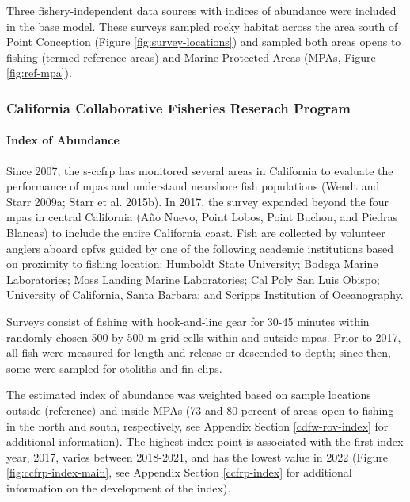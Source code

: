 \documentclass[11pt,
  english,
  letterpaper,
]{article}
\begin{document}
Three fishery-independent data sources with indices of abundance were included in the base model. These surveys sampled rocky habitat across the area south of Point Conception (Figure \ref{fig:survey-locations}) and sampled both areas opens to fishing (termed reference areas) and Marine Protected Areas (MPAs, Figure \ref{fig:ref-mpa}).

\hypertarget{california-collaborative-fisheries-reserach-program}{%
\subsubsection{California Collaborative Fisheries Reserach Program}\label{california-collaborative-fisheries-reserach-program}}

\hypertarget{index-of-abundance}{%
\paragraph{Index of Abundance}\label{index-of-abundance}}

\hfill\break

Since 2007, the \gls{s-ccfrp} has monitored several areas in California to evaluate the performance of \glspl{mpa} and understand nearshore fish populations (Wendt and Starr 2009a; Starr et al. 2015b). In 2017, the survey expanded beyond the four \Gls{mpa}s in central California (Año Nuevo, Point Lobos, Point Buchon, and Piedras Blancas) to include the entire California coast. Fish are collected by volunteer anglers aboard \glspl{cpfv} guided by one of the following academic institutions based on proximity to fishing location: Humboldt State University; Bodega Marine Laboratories; Moss Landing Marine Laboratories; Cal Poly San Luis Obispo; University of California, Santa Barbara; and Scripps Institution of Oceanography.

Surveys consist of fishing with hook-and-line gear for 30-45 minutes within randomly chosen 500 by 500-m grid cells within and outside \glspl{mpa}. Prior to 2017, all fish were measured for length and release or descended to depth; since then, some were sampled for otoliths and fin clips.

The estimated index of abundance was weighted based on sample locations outside (reference) and inside MPAs (73 and 80 percent of areas open to fishing in the north and south, respectively, see Appendix Section \ref{cdfw-rov-index} for additional information). The highest index point is associated with the first index year, 2017, varies between 2018-2021, and has the lowest value in 2022 (Figure \ref{fig:ccfrp-index-main}, see Appendix Section \ref{ccfrp-index} for additional information on the development of the index).
\end{document}
